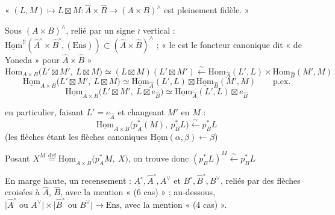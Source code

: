 \documentclass[11pt,a4paper]{article}
\begin{document}
« $(L,M) \mapsto L \boxtimes M : \widehat{A} \times \widehat{B} \to
(A\times B)^{\wedge}$ est pleinement fidèle. »

Sous $(A\times B)^{\wedge}$, relié par un signe $\wr$ vertical :
$\underline{\mathrm{Hom}}^{!!}(\widehat{A}^{\circ} \times \widehat{B}^{\circ},
(\mathrm{Ens})) \subset (\widehat{A} \times \widehat{B})^{\wedge}$ ;
« le  est le foncteur canonique dit « de Yoneda » pour
$\widehat{A} \times \widehat{B}$ »
\[
\mathrm{Hom}_{A\times B}\bigl(L'\boxtimes M',\ L\boxtimes M\bigr)
\simeq (L \boxtimes M)(L' \boxtimes M')
\overset{\sim}{\longleftarrow}
\mathrm{Hom}_{\widehat{A}}(L',L) \times \mathrm{Hom}_{\widehat{B}}(M',M)
\]
\[
\underline{\mathrm{Hom}}_{A\times B}\bigl(L'\boxtimes M',\ L\boxtimes M\bigr)
\simeq \underline{\mathrm{Hom}}_{\widehat{A}}(L',L) \boxtimes
       \underline{\mathrm{Hom}}_{\widehat{B}}(M',M)
\qquad \text{p.ex.}
\]
\[
\underline{\mathrm{Hom}}_{A\times B}\bigl(L'\boxtimes M',\ L\boxtimes e_{\widehat{B}}\bigr)
\simeq \underline{\mathrm{Hom}}_{\widehat{A}}(L',L) \boxtimes e_{\widehat{B}}
\]

en particulier, faisant $L' = e_{\widehat{A}}$ et changeant $M'$ en $M$ :
\[
\underline{\mathrm{Hom}}_{A\times B}\bigl(p_{A}^{*}(M),\ p_{B}^{*}L\bigr)
\overset{\sim}{\longleftarrow} p_{B}^{*}L
\]
(les flèches étant les flèches canoniques
$\underline{\mathrm{Hom}}(\alpha, \beta) \leftarrow \beta$)

Posant $X^{M} \overset{\mathrm{def}}{=}
\underline{\mathrm{Hom}}_{A\times B}\bigl(p_{A}^{*}M,\ X\bigr)$, on trouve
donc $(p_{B}^{*}L)^{M} \overset{\sim}{\longleftarrow} p_{B}^{*}L$

En marge haute, un recensement : $A^{\circ}, \widehat{A}^{\circ}, A^{\vee}$
et $B^{\circ}, \widehat{B}^{\circ}, B^{\vee}$, reliés par des flèches
croisées à $\widehat{A}$, $\widehat{B}$, avec la mention « (6 cas) » ;
au-dessous,
$\bigl|\widehat{A}^{\circ} \text{ ou } A^{\vee}\bigr| \times
 \bigl|\widehat{B}^{\circ} \text{ ou } B^{\vee}\bigr| \to \mathrm{Ens}$,
avec la mention « (4 cas) ».
\end{document}
